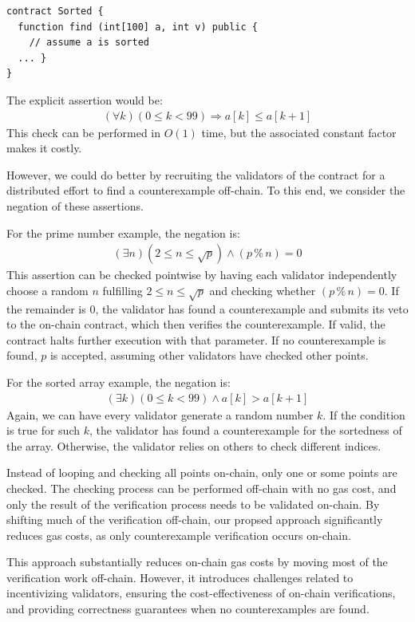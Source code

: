 \documentclass[runningheads]{llncs}
\begin{document}
\begin{lstlisting}[numbers=none]
contract Sorted {
  function find (int[100] a, int v) public {
    // assume a is sorted 
  ... } 
}
\end{lstlisting}
The explicit assertion would be:
\begin{gather*}\label{}
  (\forall k) (0\leq k <99) \Rightarrow a[k] \leq a[k+1]
\end{gather*}
This check can be performed in \(O(1)\) time, but the associated constant factor makes it costly.

However, we could do better by recruiting the validators of the contract for a distributed effort to find a counterexample off-chain. To this end, we consider the negation of these assertions. 

For the prime number example, the negation is:
\begin{gather*}\label{}
  (\exists n) (2 \leq n \leq \sqrt{p}) \wedge (p \mathbin{\%} n) = 0
\end{gather*}
This assertion can be checked pointwise by having each validator independently choose a random \(n\) fulfilling \(2 \leq n \leq \sqrt{p}\) and checking whether \((p \mathbin{\%} n) = 0\). If the remainder is \(0\), the validator has found a counterexample and submits its veto to the on-chain contract, which then verifies the counterexample. If valid, the contract halts further execution with that parameter. If no counterexample is found, \(p\) is accepted, assuming other validators have checked other points.

For the sorted array example, the negation is:
\begin{gather*}\label{}
  (\exists k) (0\leq k <99) \wedge a[k] > a[k+1]
\end{gather*}
Again, we can have every validator generate a random number \(k\). If the condition is true for such \(k\), the validator has found a counterexample for the sortedness of the array. Otherwise, the validator relies on others to check different indices.

Instead of looping and checking all points on-chain, only one or some points are checked. The checking process can be performed off-chain with no gas cost, and only the result of the verification process needs to be validated on-chain. By shifting much of the verification off-chain, our propsed approach significantly reduces gas costs, as only counterexample verification occurs on-chain.

This approach substantially reduces on-chain gas costs by moving most of the verification work off-chain. However, it introduces challenges related to incentivizing validators, ensuring the cost-effectiveness of on-chain verifications, and providing correctness guarantees when no counterexamples are found.
\end{document}
